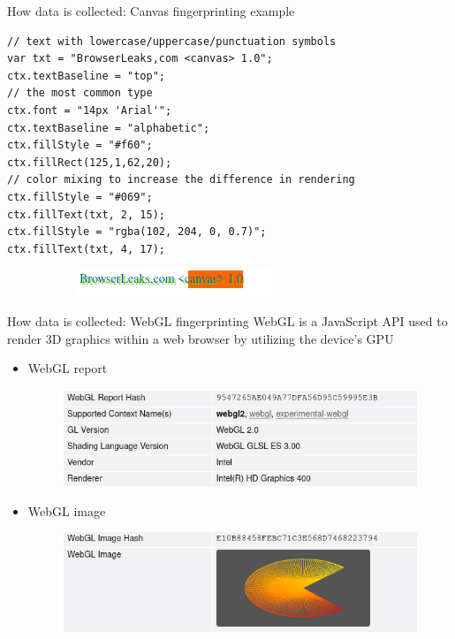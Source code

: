 \begin{frame}[fragile]{How data is collected: Canvas fingerprinting example}
  \begin{verbatim}
// text with lowercase/uppercase/punctuation symbols
var txt = "BrowserLeaks,com <canvas> 1.0";
ctx.textBaseline = "top";
// the most common type
ctx.font = "14px 'Arial'";
ctx.textBaseline = "alphabetic";
ctx.fillStyle = "#f60";
ctx.fillRect(125,1,62,20);
// color mixing to increase the difference in rendering
ctx.fillStyle = "#069";
ctx.fillText(txt, 2, 15);
ctx.fillStyle = "rgba(102, 204, 0, 0.7)";
ctx.fillText(txt, 4, 17);
  \end{verbatim}

  \begin{figure}
    \centering
    \begin{subfigure}{0.45\textwidth}
      \includegraphics[width=\linewidth]{images/canvas.png}
    \end{subfigure}
    \begin{subfigure}{0.45\textwidth}
    \end{subfigure}
  \end{figure}
\end{frame}

\begin{frame}{How data is collected: WebGL fingerprinting}
  WebGL is a JavaScript API used to render 3D graphics within a web browser by utilizing the device's GPU
  \begin{itemize}
    \item WebGL report
          \begin{figure}
            \centering
            \includegraphics[width=\linewidth, scale=0.9]{images/webgl-report.png}
          \end{figure}
    \item WebGL image
          \begin{figure}
            \centering
            \includegraphics[width=\linewidth, scale=0.9]{images/webgl-image.png}
          \end{figure}
  \end{itemize}
\end{frame}
